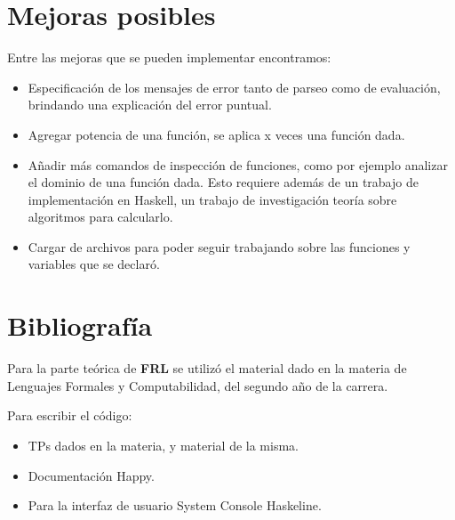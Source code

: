 \documentclass[a4paper,13pt,proof]{article}
\theoremstyle{mytheor}
\begin{document}
\section{Mejoras posibles}

Entre las mejoras que se pueden implementar encontramos:

\begin{itemize}
    \item Especificación de los mensajes de error tanto de parseo como de evaluación, brindando una explicación del error puntual.
    \item Agregar potencia de una función, se aplica x veces una función dada.
    \item Añadir más comandos de inspección de funciones, como por ejemplo analizar el dominio de una función dada. Esto requiere además de un trabajo de implementación en Haskell, un trabajo de investigación teoría sobre algoritmos para calcularlo.
    \item Cargar de archivos para poder seguir trabajando sobre las funciones y variables que se declaró.
\end{itemize}


\section{Bibliografía}

Para la parte teórica de \textbf{FRL} se utilizó el material dado en la materia de Lenguajes Formales y Computabilidad, del segundo año de la carrera.

Para escribir el código:

\begin{itemize}
    \item TPs dados en la materia, y material de la misma.
    \item Documentación Happy.
    \item Para la interfaz de usuario System Console Haskeline.
\end{itemize}
\end{document}
